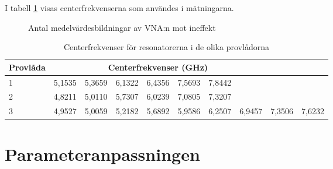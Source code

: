 \documentclass[main.tex]{subfiles}
\begin{document}
I tabell \ref{tab:utanfil} visas centerfrekvenserna som användes i mätningarna.




\begin{figure}[h]
    \centering
    \setlength{}
    \setlength\figureheight{10em}
    
    \caption{Antal medelvärdesbildningar av VNA:n mot ineffekt}
    \label{fig:medel}
\end{figure}


\begin{table}[h]
    \centering
        \caption{Centerfrekvenser för resonatorerna i de olika provlådorna}
    \label{tab:utanfil}
    \begin{tabular}{lccccccccc}
    \toprule
        \textbf{Provlåda}  & \multicolumn{7}{c}{Centerfrekvenser (GHz)} \\
        \midrule

        1 & 5,1535 & 5,3659 & 6,1322 & 6,4356 & 7,5693 & 7,8442 &\\
        2 & 4,8211 & 5,0110 & 5,7307 & 6,0239 & 7,0805  &  7,3207 & \\
        3 & 4,9527 & 5,0059 & 5,2182 & 5,6892 & 5,9586 & 6,2507 & 6,9457 & 7,3506 & 7,6232\\
        \bottomrule
    \end{tabular}
\end{table}


\section{Parameteranpassningen}

\end{document}
